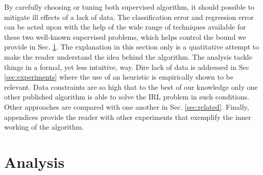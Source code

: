 \documentclass[11pt]{article}
\begin{document}
By carefully choosing or tuning both supervised algorithm, it should possible to mitigate ill effects of a lack of data. The classification error and regression error can be acted upon with the help of the wide range of techniques available for these two well-known supervised problems, which helps control the bound we provide in Sec. \ref{sec:analysis}. The explanation in this section only is a quatitative attempt to make the reader understand the idea behind the algorithm. The analysis tackle things in a formal, yet less intuitive, way. Dire lack of data is addressed in Sec \ref{sec:experiments} where the use of an heuristic is empirically shown to be relevant. Data constraints are so high that to the best of our knowledge only one other published algorithm is able to solve the IRL problem in such conditions. Other approaches are compared with one another in Sec. \ref{sec:related}. Finally, appendices provide the reader with other experiments that exemplify the inner working of the algorithm.

\section{Analysis}
\label{sec:analysis}


\end{document}
